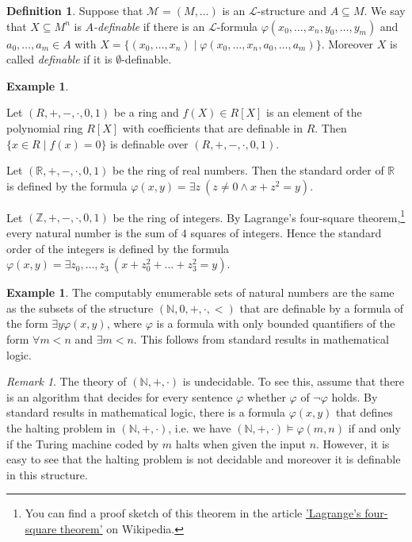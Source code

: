 \documentclass[10pt]{amsart}
\renewcommand{\L}{\mathcal{L}}
\newcommand{\ZZ}{\mathbb{Z}}
\newcommand{\RR}{\mathbb{R}}
\newcommand{\NNN}{\mathbb{N}}
\newcommand{\MM}{\mathcal{M}}
\newcommand{\NN}{\mathcal{N}}
\theoremstyle{definition}
\newtheorem{definition}[theorem]{Definition}
\newtheorem{example}[theorem]{Example}
\theoremstyle{remark}
\newtheorem{remark}[theorem]{Remark}
\newenvironment{enumerate-(a)}{\begin{enumerate}[label={\upshape (\alph*)}, leftmargin=2pc]}{\end{enumerate}}
\begin{document}
\begin{definition} 
Suppose that $\MM=(M,\dots)$ is an $\L$-structure and $A\subseteq M$. We say that $X\subseteq M^n$ is \emph{$A$-definable} if there is an $\L$-formula $\varphi(x_0,\dots,x_n,y_0,\dots,y_m)$ and $a_0,\dots,a_m\in A$ with $X=\{(x_0,\dots,x_n)\mid \varphi(x_0,\dots,x_n,a_0,\dots,a_m)\}$. Moreover $X$ is called \emph{definable} if it is $\emptyset$-definable. 
\end{definition} 

\begin{example} 
\begin{enumerate-(a)} 
\item 
Let $(R,+,-,\cdot,0,1)$ be a ring and $f(X)\in R[X]$ is an element of the polynomial ring $R[X]$ with coefficients that are definable in $R$. Then $\{x\in R\mid f(x)=0\}$ is definable over $(R,+,-,\cdot,0,1)$. 
\item 
Let $(\RR,+,-,\cdot,0,1)$ be the ring of real numbers. Then the standard order of $\RR$ is defined by the formula $\varphi(x,y)=\exists z\ (z\neq0\wedge x+z^2=y)$. 
\item 
Let $(\ZZ,+,-,\cdot,0,1)$ be the ring of integers. By Lagrange's four-square theorem,\footnote{You can find a proof sketch of this theorem in the article \href{https://en.wikipedia.org/wiki/Lagrange\%27s_four-square_theorem}{'Lagrange's four-square theorem'} on Wikipedia. } 
every natural number is the sum of $4$ squares of integers. Hence the standard order of the integers is defined by the formula $\varphi(x,y)=\exists z_0,\dots,z_3\ (x+z_0^2+\dots+z_3^2=y)$. 
\end{enumerate-(a)} 
\end{example} 

\begin{example} 
The computably enumerable sets of natural numbers are the same as the subsets of the structure $(\NNN,0,+,\cdot,<)$ that are definable by a formula of the form $\exists y\varphi(x,y)$, where $\varphi$ is a formula with only bounded quantifiers of the form $\forall m< n$ and $\exists m< n$. This follows from standard results in mathematical logic. 
\end{example} 

\begin{remark} 
The theory of $(\NNN,+,\cdot)$ is undecidable. To see this, assume that there is an algorithm that decides for every sentence $\varphi$ whether $\varphi$ of $\neg\varphi$ holds. 
By standard results in mathematical logic, there is a formula $\varphi(x,y)$ that defines the halting problem in $(\NNN,+,\cdot)$, i.e. we have $(\NNN,+,\cdot)\models \varphi(m,n)$ if and only if the Turing machine coded by $m$ halts when given the input $n$. However, it is easy to see that the halting problem is not decidable and moreover it is definable in this structure. 
\end{remark} 
\end{document}
